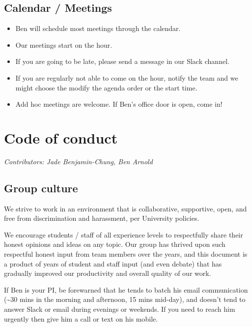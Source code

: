 \documentclass[]{book}
\providecommand{\tightlist}{%
  \setlength{\itemsep}{0pt}\setlength{\parskip}{0pt}}
\begin{document}
\hypertarget{calendar-meetings}{%
\section{Calendar / Meetings}\label{calendar-meetings}}

\begin{itemize}
\tightlist
\item
  Ben will schedule most meetings through the calendar.
\item
  Our meetings start on the hour.
\item
  If you are going to be late, please send a message in our Slack channel.
\item
  If you are regularly not able to come on the hour, notify the team and we might choose the modify the agenda order or the start time.
\item
  Add hoc meetings are welcome. If Ben's office door is open, come in!
\end{itemize}

\hypertarget{code-of-conduct}{%
\chapter{Code of conduct}\label{code-of-conduct}}

\emph{Contributors: Jade Benjamin-Chung, Ben Arnold}

\hypertarget{group-culture}{%
\section{Group culture}\label{group-culture}}

We strive to work in an environment that is collaborative, supportive, open, and free from discrimination and harassment, per University policies.

We encourage students / staff of all experience levels to respectfully share their honest opinions and ideas on any topic. Our group has thrived upon such respectful honest input from team members over the years, and this document is a product of years of student and staff input (and even debate) that has gradually improved our productivity and overall quality of our work.

If Ben is your PI, be forewarned that he tends to batch his email communication (\textasciitilde30 mins in the morning and afternoon, 15 mins mid-day), and doesn't tend to answer Slack or email during evenings or weekends. If you need to reach him urgently then give him a call or text on his mobile.
\end{document}
